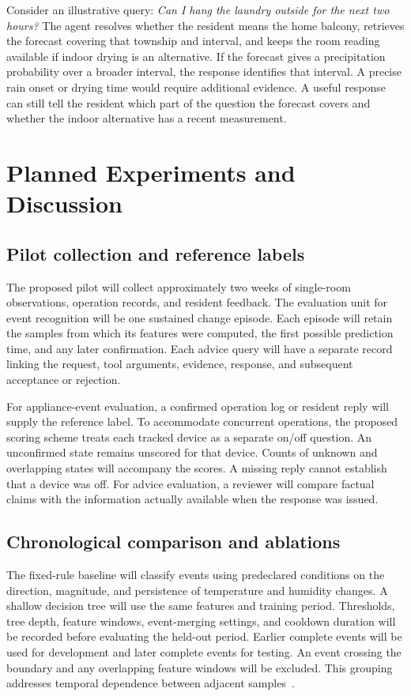 \documentclass[conference]{IEEEtran}
\begin{document}
Consider an illustrative query: \emph{Can I hang the laundry outside for the next two hours?} The agent resolves whether the resident means the home balcony, retrieves the forecast covering that township and interval, and keeps the room reading available if indoor drying is an alternative. If the forecast gives a precipitation probability over a broader interval, the response identifies that interval. A precise rain onset or drying time would require additional evidence. A useful response can still tell the resident which part of the question the forecast covers and whether the indoor alternative has a recent measurement.

\section{Planned Experiments and Discussion}\label{sec:experiments}
\subsection{Pilot collection and reference labels}
The proposed pilot will collect approximately two weeks of single-room observations, operation records, and resident feedback. The evaluation unit for event recognition will be one sustained change episode. Each episode will retain the samples from which its features were computed, the first possible prediction time, and any later confirmation. Each advice query will have a separate record linking the request, tool arguments, evidence, response, and subsequent acceptance or rejection.

For appliance-event evaluation, a confirmed operation log or resident reply will supply the reference label. To accommodate concurrent operations, the proposed scoring scheme treats each tracked device as a separate on/off question. An unconfirmed state remains unscored for that device. Counts of unknown and overlapping states will accompany the scores. A missing reply cannot establish that a device was off. For advice evaluation, a reviewer will compare factual claims with the information actually available when the response was issued.

\subsection{Chronological comparison and ablations}
The fixed-rule baseline will classify events using predeclared conditions on the direction, magnitude, and persistence of temperature and humidity changes. A shallow decision tree will use the same features and training period. Thresholds, tree depth, feature windows, event-merging settings, and cooldown duration will be recorded before evaluating the held-out period. Earlier complete events will be used for development and later complete events for testing. An event crossing the boundary and any overlapping feature windows will be excluded. This grouping addresses temporal dependence between adjacent samples~\cite{roberts}.
\end{document}
